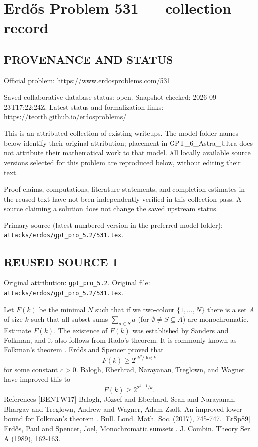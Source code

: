 \section*{Erd\H{o}s Problem 531 --- collection record}

\subsection*{PROVENANCE AND STATUS}
Official problem: https://www.erdosproblems.com/531

Saved collaborative-database status: open.
Snapshot checked: 2026-09-23T17:22:24Z.
Latest status and formalization links: https://teorth.github.io/erdosproblems/

This is an attributed collection of existing writeups. The model-folder names below identify their original attribution; placement in GPT\_6\_Astra\_Ultra does not attribute their mathematical work to that model. All locally available source versions selected for this problem are reproduced below, without editing their text.

Proof claims, computations, literature statements, and completion estimates in the reused text have not been independently verified in this collection pass. A source claiming a solution does not change the saved upstream status.

Primary source (latest numbered version in the preferred model folder): \texttt{attacks/erdos/gpt\_pro\_5.2/531.tex}.

\subsection*{REUSED SOURCE 1}
Original attribution: \texttt{gpt\_pro\_5.2}.
Original file: \texttt{attacks/erdos/gpt\_pro\_5.2/531.tex}.


Let $F(k)$ be the minimal $N$ such that if we two-colour $\{1,\ldots,N\}$ there is a set $A$ of size $k$ such that all subset sums $\sum_{a\in S}a$ (for $\emptyset\neq S\subseteq A$) are monochromatic. Estimate $F(k)$. The existence of $F(k)$ was established by Sanders and Folkman, and it also follows from Rado's theorem. It is commonly known as Folkman's theorem . Erd\H{o}s and Spencer \cite{ErSp89} proved that\[F(k) \geq 2^{ck^2/\log k}\]for some constant $c>0$. Balogh, Eberhrad, Narayanan, Treglown, and Wagner \cite{BENTW17} have improved this to\[F(k) \geq 2^{2^{k-1}/k}.\] References [BENTW17] Balogh, J\'{o}zsef and Eberhard, Sean and Narayanan, Bhargav and Treglown, Andrew and Wagner, Adam Zsolt, An improved lower bound for Folkman's theorem . Bull. Lond. Math. Soc. (2017), 745-747. [ErSp89] Erd\H{o}s, Paul and Spencer, Joel, Monochromatic sumsets . J. Combin. Theory Ser. A (1989), 162-163.


